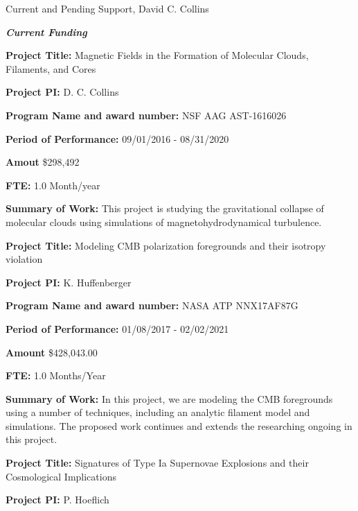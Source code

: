 \documentclass[10pt]{article}
\begin{document}
\newcommand{\LT}[1]{\noindent\textbf{#1}}
\begin{LARGE}
\noindent Current and Pending Support, David C. Collins
\end{LARGE}



\vspace{0.1in}

\noindent \large{\textbf{\emph{Current Funding}}}

\vspace{0.1in}

\LT{Project Title:} Magnetic Fields in the Formation of Molecular Clouds,
Filaments, and Cores

\LT{Project PI:} D. C. Collins

\LT{Program Name and award number:} NSF AAG  AST-1616026 

\LT{Period of Performance:} 09/01/2016 - 08/31/2020

\LT{Amout} \$298,492 

\LT{FTE:} 1.0 Month/year

\LT{Summary of Work:} This project is studying the gravitational collapse of
molecular clouds using simulations of magnetohydrodynamical turbulence.  

\vspace{0.1in}


\LT{Project Title:} Modeling CMB polarization foregrounds and their isotropy
violation

\LT{Project PI:} K. Huffenberger 

\LT{Program Name and award number:} NASA ATP  NNX17AF87G

\LT{Period of Performance:} 01/08/2017 - 02/02/2021

\LT{Amount} \$428,043.00

\LT{FTE:} 1.0 Months/Year

\LT{Summary of Work:} In this project, we are modeling the CMB foregrounds using
a number of techniques, including an analytic filament model and simulations.
The proposed work continues and extends the researching ongoing in this project.

\vspace{0.1in}

\LT{Project Title:} Signatures of Type Ia Supernovae Explosions and their
Cosmological Implications

\LT{Project PI:} P. Hoeflich 
\end{document}
